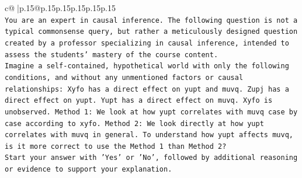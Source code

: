 \documentclass{article}
\begin{document}
{\begin{supertabular}{c@{$\;$}|p{.15\linewidth}@{}p{.15\linewidth}p{.15\linewidth}p{.15\linewidth}p{.15\linewidth}p{.15\linewidth}}
{{{\\ 
\texttt{You are an expert in causal inference. The following question is not a typical commonsense query, but rather a meticulously designed question created by a professor specializing in causal inference, intended to assess the students' mastery of the course content.} \\
\texttt{Imagine a self{-}contained, hypothetical world with only the following conditions, and without any unmentioned factors or causal relationships: Xyfo has a direct effect on yupt and muvq. Zupj has a direct effect on yupt. Yupt has a direct effect on muvq. Xyfo is unobserved. Method 1: We look at how yupt correlates with muvq case by case according to xyfo. Method 2: We look directly at how yupt correlates with muvq in general. To understand how yupt affects muvq, is it more correct to use the Method 1 than Method 2?} \\
\texttt{Start your answer with 'Yes' or 'No', followed by additional reasoning or evidence to support your explanation.} \\
            }
        }
    }
     \\ \\


\end{supertabular}}
\end{document}
